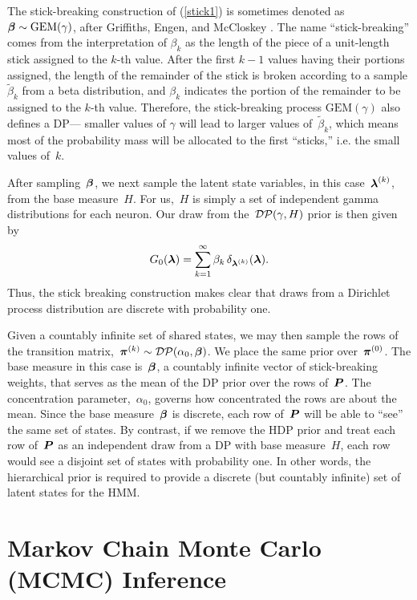 The stick-breaking construction of (\ref{stick1}) is sometimes denoted
as~${\boldsymbol{\beta} \sim \mathrm{GEM}(\gamma)}$, after Griffiths, Engen, and
McCloskey \citep{Ewens90}.  The name ``stick-breaking'' comes from the
interpretation of $\beta_k$ as the length of the piece of a
unit-length stick assigned to the $k$-th value.  After the first $k-1$
values having their portions assigned, the length of the remainder of
the stick is broken according to a sample $\widetilde{\beta}_k$ from a
beta distribution, and ${\beta}_k$ indicates the portion of the
remainder to be assigned to the $k$-th value. Therefore, the
stick-breaking process $\mathrm{GEM}(\gamma)$ also defines a DP---
smaller values of $\gamma$ will lead to larger values
of~$\widetilde{\beta}_k$, which means most of the probability mass
will be allocated to the first ``sticks,'' i.e. the small values
of~$k$.

After sampling~$\boldsymbol{\beta}$, we next sample the latent state variables, in
this case~${\boldsymbol{\lambda}^{(k)}}$, from the base measure~$H$. For us,~$H$ is 
simply a set of independent gamma distributions for each neuron.
Our draw from
the~${\mathcal{DP}(\gamma,H)}$ prior is then given by
\begin{align*}
G_0(\boldsymbol{\lambda})=\sum_{k=1}^\infty \beta_k \, \delta_{\boldsymbol{\lambda}^{(k)}}(\boldsymbol{\lambda}).
\end{align*}
Thus, the stick breaking construction makes clear that draws from a
Dirichlet process distribution are discrete with probability one.

Given a countably infinite set of shared states, we may then sample
the rows of the transition
matrix,~${\boldsymbol{\pi}^{(k)}\sim\mathcal{DP}(\alpha_0,\boldsymbol{\beta})}$. We place the
same prior over~$\boldsymbol{\pi}^{(0)}$.  The base measure in this case is~$\boldsymbol{\beta}$, a
countably infinite vector of stick-breaking weights, that serves as
the mean of the DP prior over the rows of~$\boldsymbol{P}$. The concentration
parameter,~$\alpha_0$, governs how concentrated the rows are about the
mean. Since the base measure~$\boldsymbol{\beta}$ is discrete, each row of~$\boldsymbol{P}$
will be able to ``see'' the same set of states. By contrast, if we
remove the HDP prior and treat each row of~$\boldsymbol{P}$ as an independent draw
from a DP with base measure~$H$, each row would see a disjoint set of
states with probability one. In other words, the hierarchical prior is
required to provide a discrete (but countably infinite) set of latent
states for the HMM.

\section{Markov Chain Monte Carlo (MCMC) Inference}


